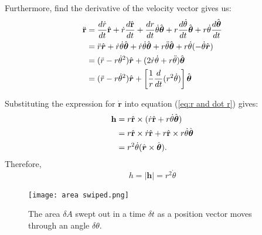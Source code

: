 Furthermore, find the derivative of the velocity vector gives us:
\begin{align}
    \ddot{\mathbf{r}}
    & = \frac{d\dot{r}}{dt}\hat{\mathbf{r}} + \dot{r}\frac{d\hat{\mathbf{r}}}{dt} + \frac{dr}{dt}\dot{\theta}\hat{\boldsymbol{\theta}} + r\frac{d\dot{\theta}}{dt}\hat{\boldsymbol{\theta}} + r\dot{\theta}\frac{d\hat{\boldsymbol{\theta}}}{dt} \notag\\
    & = \ddot{r}\hat{\boldsymbol{r}} + \dot{r}\dot{\theta}\hat{\boldsymbol{\theta}} + \dot{r}\dot{\theta}\hat{\boldsymbol{\theta}} + r\ddot{\theta}\hat{\boldsymbol{\theta}} + r\dot{\theta}(-\dot{\theta}\hat{\boldsymbol{r}}) \notag\\
    & = (\ddot{r} - r\dot{\theta}^2)\hat{\boldsymbol{r}} + (2\dot{r}\dot{\theta} + r\ddot{\theta})\hat{\boldsymbol{\theta}}\\
    & = (\ddot{r} - r\dot{\theta}^2)\hat{\boldsymbol{r}} + \left[ \frac{1}{r}\frac{d}{dt}(r^2\dot{\theta}) \right] \hat{\boldsymbol{\theta}}
    \label{ddot r}
\end{align}

Substituting the expression for $\dot{\mathbf{r}}$ into equation (\ref{eq:r and dot r}) gives:
\begin{align}
    \mathbf{h}
    & = r\hat{\mathbf{r}} \times (\dot{r}\hat{\mathbf{r}} + r\dot{\theta}\hat{\boldsymbol{\theta}}) \notag\\
    & = r\hat{\mathbf{r}} \times \dot{r}\hat{\mathbf{r}} + r\hat{\mathbf{r}} \times r\dot{\theta}\hat{\boldsymbol{\theta}} \notag\\
    & = r^2\dot{\theta} (\hat{\boldsymbol{r}} \times \hat{\boldsymbol{\theta}}).
\end{align}
Therefore,
\begin{equation}
    h = \left| \mathbf{h} \right| = r^2\dot{\theta}
    \label{eq:h=r2 dot theta}
\end{equation}

\begin{figure}[h]
    \centering
    \texttt{[image: area swiped.png]}
    \caption{The area $\delta A$ swept out in a time $\delta t$ as a position vector moves through an angle $\delta \theta$.}
    \label{fig:area swiped}
\end{figure}

